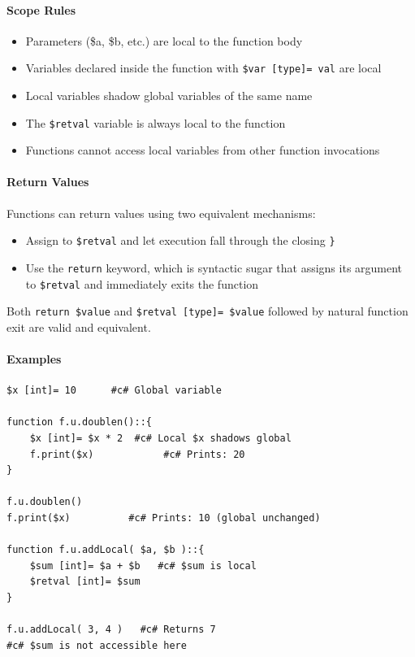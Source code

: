 \documentclass{report}
\begin{document}
\paragraph{Scope Rules}
\begin{itemize}
\item Parameters (\$a, \$b, etc.) are local to the function body
\item Variables declared inside the function with \texttt{\$var [type]= val} are local
\item Local variables shadow global variables of the same name
\item The \texttt{\$retval} variable is always local to the function
\item Functions cannot access local variables from other function invocations
\end{itemize}

\paragraph{Return Values}
Functions can return values using two equivalent mechanisms:
\begin{itemize}
\item Assign to \texttt{\$retval} and let execution fall through the closing \texttt{\}}
\item Use the \texttt{return} keyword, which is syntactic sugar that assigns its argument to \texttt{\$retval} and immediately exits the function
\end{itemize}
Both \texttt{return \$value} and \texttt{\$retval [type]= \$value} followed by natural function exit are valid and equivalent.

\paragraph{Examples}
\begin{verbatim}
$x [int]= 10      #c# Global variable

function f.u.doublen()::{
    $x [int]= $x * 2  #c# Local $x shadows global
    f.print($x)            #c# Prints: 20
}

f.u.doublen()
f.print($x)          #c# Prints: 10 (global unchanged)

function f.u.addLocal( $a, $b )::{
    $sum [int]= $a + $b   #c# $sum is local
    $retval [int]= $sum
}

f.u.addLocal( 3, 4 )   #c# Returns 7
#c# $sum is not accessible here
\end{verbatim}
\end{document}
